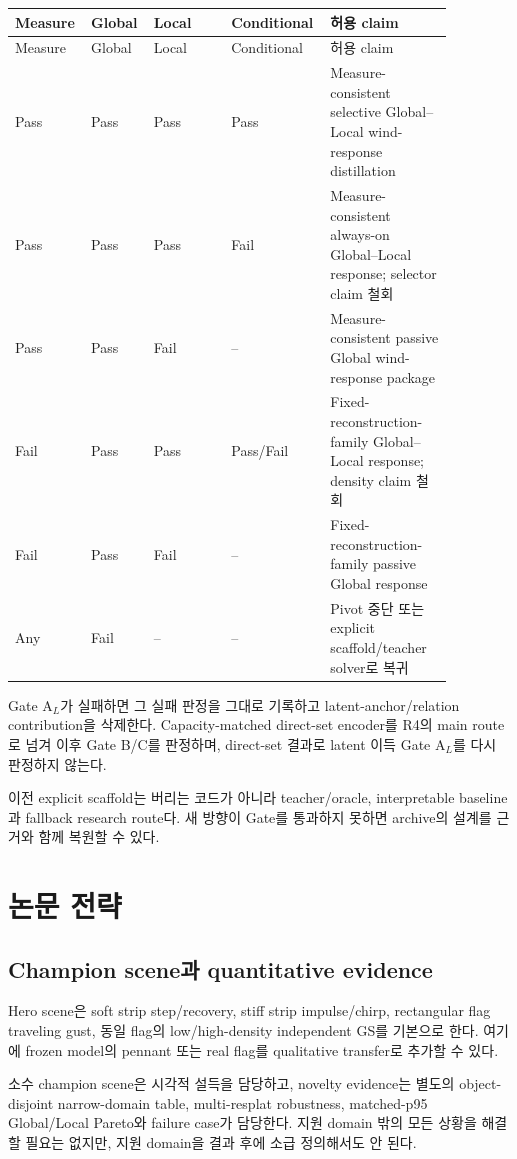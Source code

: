 \documentclass[11pt]{article}
\begin{document}
\begin{longtable}{L{0.13\linewidth}L{0.13\linewidth}L{0.17\linewidth}L{0.17\linewidth}L{0.27\linewidth}}
\toprule
Measure & Global & Local & Conditional & 허용 claim\\
\midrule
\endfirsthead
\toprule
Measure & Global & Local & Conditional & 허용 claim\\
\midrule
\endhead
Pass & Pass & Pass & Pass & Measure-consistent selective Global--Local wind-response distillation\\
Pass & Pass & Pass & Fail & Measure-consistent always-on Global--Local response; selector claim 철회\\
Pass & Pass & Fail & -- & Measure-consistent passive Global wind-response package\\
Fail & Pass & Pass & Pass/Fail & Fixed-reconstruction-family Global--Local response; density claim 철회\\
Fail & Pass & Fail & -- & Fixed-reconstruction-family passive Global response\\
Any & Fail & -- & -- & Pivot 중단 또는 explicit scaffold/teacher solver로 복귀\\
\bottomrule
\end{longtable}

Gate A\(_L\)가 실패하면 그 실패 판정을 그대로 기록하고 latent-anchor/relation contribution을 삭제한다.
Capacity-matched direct-set encoder를 R4의 main route로 넘겨 이후 Gate B/C를 판정하며,
direct-set 결과로 latent 이득 Gate A\(_L\)를 다시 판정하지 않는다.

이전 explicit scaffold는 버리는 코드가 아니라 teacher/oracle, interpretable baseline과 fallback research route다.
새 방향이 Gate를 통과하지 못하면 archive의 설계를 근거와 함께 복원할 수 있다.

\section{논문 전략}

\subsection{Champion scene과 quantitative evidence}

Hero scene은 soft strip step/recovery, stiff strip impulse/chirp, rectangular flag traveling gust,
동일 flag의 low/high-density independent GS를 기본으로 한다. 여기에 frozen model의 pennant 또는 real flag를
qualitative transfer로 추가할 수 있다.

소수 champion scene은 시각적 설득을 담당하고, novelty evidence는 별도의 object-disjoint narrow-domain table,
multi-resplat robustness, matched-p95 Global/Local Pareto와 failure case가 담당한다.
지원 domain 밖의 모든 상황을 해결할 필요는 없지만, 지원 domain을 결과 후에 소급 정의해서도 안 된다.
\end{document}

